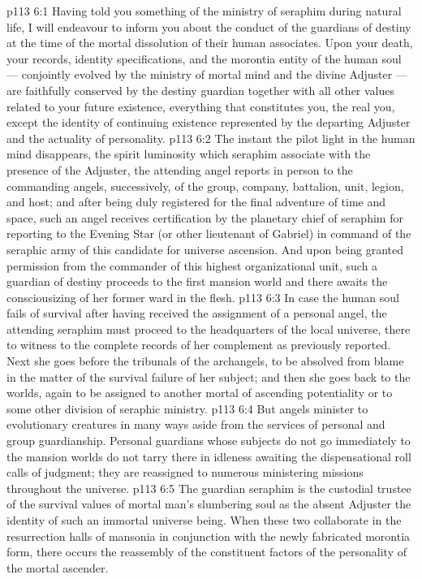 \vs p113 6:1 Having told you something of the ministry of seraphim during natural life, I will endeavour to inform you about the conduct of the guardians of destiny at the time of the mortal dissolution of their human associates. Upon your death, your records, identity specifications, and the morontia entity of the human soul --- conjointly evolved by the ministry of mortal mind and the divine Adjuster --- are faithfully conserved by the destiny guardian together with all other values related to your future existence, everything that constitutes you, the real you, except the identity of continuing existence represented by the departing Adjuster and the actuality of personality.
\vs p113 6:2 The instant the pilot light in the human mind disappears, the spirit luminosity which seraphim associate with the presence of the Adjuster, the attending angel reports in person to the commanding angels, successively, of the group, company, battalion, unit, legion, and host; and after being duly registered for the final adventure of time and space, such an angel receives certification by the planetary chief of seraphim for reporting to the Evening Star (or other lieutenant of Gabriel) in command of the seraphic army of this candidate for universe ascension. And upon being granted permission from the commander of this highest organizational unit, such a guardian of destiny proceeds to the first mansion world and there awaits the consciousizing of her former ward in the flesh.
\vs p113 6:3 \pc In case the human soul fails of survival after having received the assignment of a personal angel, the attending seraphim must proceed to the headquarters of the local universe, there to witness to the complete records of her complement as previously reported. Next she goes before the tribunals of the archangels, to be absolved from blame in the matter of the survival failure of her subject; and then she goes back to the worlds, again to be assigned to another mortal of ascending potentiality or to some other division of seraphic ministry.
\vs p113 6:4 \pc But angels minister to evolutionary creatures in many ways aside from the services of personal and group guardianship. Personal guardians whose subjects do not go immediately to the mansion worlds do not tarry there in idleness awaiting the dispensational roll calls of judgment; they are reassigned to numerous ministering missions throughout the universe.
\vs p113 6:5 The guardian seraphim is the custodial trustee of the survival values of mortal man’s slumbering soul as the absent Adjuster  the identity of such an immortal universe being. When these two collaborate in the resurrection halls of mansonia in conjunction with the newly fabricated morontia form, there occurs the reassembly of the constituent factors of the personality of the mortal ascender.
